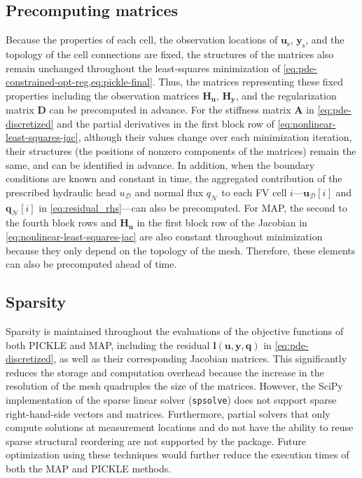 \documentclass{agujournal2019}
\begin{document}
\subsection{Precomputing matrices}
Because the properties of each cell, the observation locations of $\mathbf{u}_\mathrm{s}$,  $\mathbf{y}_\mathrm{s}$, and the topology of the cell connections are fixed, the structures of the matrices also remain unchanged throughout the least-squares minimization of \cref{eq:pde-constrained-opt-reg,eq:pickle-final}. Thus, the matrices representing these fixed properties including the observation matrices $\mathbf{H}_\mathbf{u}$, $\mathbf{H}_\mathbf{y}$, and the regularization matrix $\mathbf{D}$ can be precomputed in advance. For the stiffness matrix $\mathbf{A}$ in \cref{eq:pde-discretized} and the partial derivatives in the first block row of \cref{eq:nonlinear-least-squares-jac}, although their values change over each minimization iteration, their structures (the positions of nonzero components of the matrices) remain the same, and can be identified in advance. In addition, when the boundary conditions are known and constant in time, the aggregated contribution of the prescribed hydraulic head $u_\mathcal{D}$ and normal flux $q_\mathcal{N}$ to each FV cell $i$---$\mathbf{u}_\mathcal{D}[i]$ and $\mathbf{q}_\mathcal{N}[i]$ in \cref{eq:residual_rhs}---can also be precomputed. For MAP, the second to the fourth block rows and $\mathbf{H}_{\mathbf{u}}$ in the first block row of the Jacobian in \cref{eq:nonlinear-least-squares-jac} are also constant throughout minimization because they only depend on the topology of the mesh. Therefore, these elements can also be precomputed ahead of time.


\subsection{Sparsity}
Sparsity is maintained throughout the evaluations of the objective functions of both PICKLE and MAP, including the residual $\mathbf{l}(\mathbf{u}, \mathbf{y}, \mathbf{q})$ in \cref{eq:pde-discretized}, as well as their corresponding Jacobian matrices. This significantly reduces the storage and computation overhead because the increase in the resolution of the mesh quadruples the size of the matrices. However, the SciPy implementation of the sparse linear solver (\texttt{spsolve}) does not support sparse right-hand-side vectors and matrices. Furthermore, partial solvers that only compute solutions at measurement locations and do not have the ability to reuse sparse structural reordering are not supported by the package. Future optimization using these techniques would further reduce the execution times of both the MAP and PICKLE methods.


\end{document}
